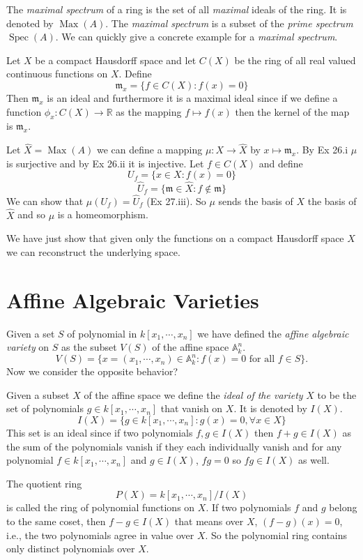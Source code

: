 \documentclass[]{report}
\DeclareMathOperator\Spec{Spec}
\DeclareMathOperator\Max{Max}
\begin{document}
The \textit{maximal spectrum} of a ring is the set of all \textit{maximal} ideals of the ring. It is denoted by $\Max(A)$. The \textit{maximal spectrum} is a subset of the \textit{prime spectrum} $\Spec(A)$. We can quickly give a concrete example for a \textit{maximal spectrum}.

Let $X$ be a compact Hausdorff space and let $C(X)$ be the ring of all real valued continuous functions on $X$. Define
$$\mathfrak{m}_x = \{f\in C(X): f(x) = 0\}$$
Then $\mathfrak{m}_x$ is an ideal and furthermore it is a maximal ideal since if we define a function $\phi_x: C(X) \rightarrow \mathbb{R}$ as the mapping $f\mapsto f(x)$ then the kernel of the map is $\mathfrak{m}_x$. 

Let $\hat{X} = \Max(A)$ we can define a mapping $\mu: X\rightarrow \hat{X}$ by $x\mapsto \mathfrak{m}_x $. By Ex 26.i $\mu$ is surjective and by Ex 26.ii it is injective. Let $f\in C(X)$ and define
$$U_f = \{x\in X:f(x) = 0\}$$
$$\hat{U}_f = \{\mathfrak{m}\in \hat{X}:f\not\in \mathfrak{m}\}$$
We can show that $\mu(U_f) = \hat{U}_f$ (Ex 27.iii). So $\mu$ sends the basis of $X$ the basis of $\hat{X}$ and so $\mu$ is a homeomorphism.

We have just show that given only the functions on a compact Hausdorff space $X$ we can reconstruct the underlying space.

\section{Affine Algebraic Varieties}

Given a set $S$ of polynomial in $k[x_1,\cdots,x_n]$ we have defined the \textit{affine algebraic variety} on $S$ as the subset $V(S)$ of the affine space $\mathbb{A}^n_k$.
$$V(S) = \{x = (x_1,\cdots,x_n) \in \mathbb{A}^n_k : f(x) = 0 \text{ for all } f \in S\}.$$
Now we consider the opposite behavior? 

Given a subset $X$ of the affine space we define the \textit{ideal of the variety} $X$ to be the set of polynomials $g\in k[x_1,\cdots,x_n]$ that vanish on $X$. It is denoted by $I(X)$.
$$I(X) = \{g\in k[x_1,\cdots,x_n]: g(x) = 0, \forall x\in X\}$$
This set is an ideal since if two polynomials $f,g\in I(X)$ then $f+g\in I(X)$ as the sum of the polynomials vanish if they each individually vanish and for any polynomial $f \in k[x_1,\cdots, x_n]$ and $g\in I(X)$, $fg = 0$ so $fg\in I(X)$ as well.

    The quotient ring
    $$P(X) = k[x_1,\cdots,x_n]/I(X)$$
    is called the ring of polynomial functions on $X$. If two polynomials $f$ and $g$ belong to the same coset, then $f-g \in I(X)$ that means over $X$, $(f-g)(x) = 0$, i.e., the two polynomials agree in value over $X$. So the polynomial ring contains only distinct polynomials over $X$.
\end{document}
